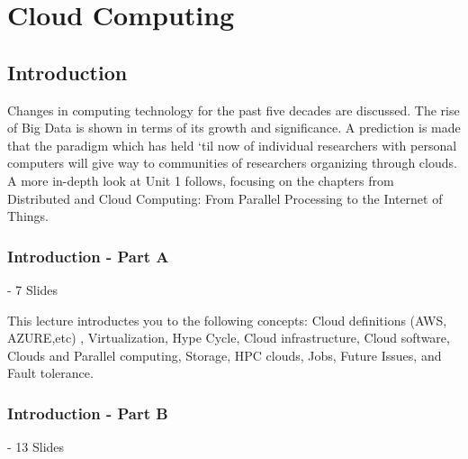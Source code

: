 \chapter{Cloud Computing}
\label{sec:icloud-fundamentals}

\FILENAME

\section{Introduction}

Changes in computing technology for the past five decades are discussed.
The rise of Big Data is shown in terms of its growth and significance. A
prediction is made that the paradigm which has held `til now of
individual researchers with personal computers will give way to
communities of researchers organizing through clouds. A more in-depth
look at Unit 1 follows, focusing on the chapters from Distributed and
Cloud Computing: From Parallel Processing to the Internet of Things.

%


\subsection{Introduction - Part A}\label{s:cloud-fundamentals-a}

 - 7 Slides

This lecture introductes you to the following concepts: Cloud
definitions (AWS, AZURE,etc) , Virtualization, Hype Cycle, Cloud
infrastructure, Cloud software, Clouds and Parallel computing,
Storage, HPC clouds, Jobs, Future Issues, and Fault tolerance.

\subsection{Introduction - Part B}\label{s:cloud-fundamentals-b}

 - 13 Slides

